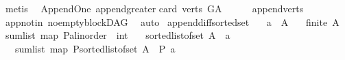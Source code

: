 \begin{isabellebody}
\ metis%
\endisatagproof
{\isafoldproof}%
%
\isadelimproof
\isanewline
%
\endisadelimproof
\isanewline
{}\isamarkupfalse%
\ {\isacharparenleft}{\kern0pt}\ Append{\isacharunderscore}{\kern0pt}One{\isacharparenright}{\kern0pt}\ append{\isacharunderscore}{\kern0pt}greater{\isacharunderscore}{\kern0pt}{}{\isacharcolon}{\kern0pt}\isanewline
{\isachardoublequoteopen}card\ {\isacharparenleft}{\kern0pt}verts\ G{\isacharunderscore}{\kern0pt}A{\isacharparenright}{\kern0pt}\ {\isachargreater}{\kern0pt}\ {}{\isachardoublequoteclose}\isanewline
%
\isadelimproof
\ \ %
\endisadelimproof
%
\isatagproof
{}\isamarkupfalse%
\ append{\isacharunderscore}{\kern0pt}verts\ \isanewline
\ \ \isamarkupfalse%
\ app{\isacharunderscore}{\kern0pt}notin\ no{\isacharunderscore}{\kern0pt}empty{\isacharunderscore}{\kern0pt}blockDAG\ \isamarkupfalse%
\ auto%
\endisatagproof
{\isafoldproof}%
%
\isadelimproof
\isanewline
%
\endisadelimproof
\isanewline
\isanewline
{}\isamarkupfalse%
\ append{\isacharunderscore}{\kern0pt}diff{\isacharunderscore}{\kern0pt}sorted{\isacharunderscore}{\kern0pt}set{\isacharcolon}{\kern0pt}\isanewline
\ \ \ {\isachardoublequoteopen}a\ {\isasymin}\ A{\isachardoublequoteclose}\isanewline
\ \ \ {\isachardoublequoteopen}finite\ A{\isachardoublequoteclose}\isanewline
{}\ {\isachardoublequoteopen}sum{\isacharunderscore}{\kern0pt}list\ {\isacharparenleft}{\kern0pt}{\isacharparenleft}{\kern0pt}map\ {\isacharparenleft}{\kern0pt}P{\isacharcolon}{\kern0pt}{\isacharcolon}{\kern0pt}{\isacharparenleft}{\kern0pt}{\isacharprime}{\kern0pt}a{\isacharcolon}{\kern0pt}{\isacharcolon}{\kern0pt}linorder\ {\isasymRightarrow}\ int{\isacharparenright}{\kern0pt}{\isacharparenright}{\kern0pt}{\isacharparenright}{\kern0pt}\isanewline
\ \ \ {\isacharparenleft}{\kern0pt}sorted{\isacharunderscore}{\kern0pt}list{\isacharunderscore}{\kern0pt}of{\isacharunderscore}{\kern0pt}set\ {\isacharparenleft}{\kern0pt}A\ {\isacharminus}{\kern0pt}\ {\isacharbraceleft}{\kern0pt}a{\isacharbraceright}{\kern0pt}{\isacharparenright}{\kern0pt}{\isacharparenright}{\kern0pt}{\isacharparenright}{\kern0pt}\ \isanewline
\ \ {\isacharequal}{\kern0pt}\ sum{\isacharunderscore}{\kern0pt}list\ {\isacharparenleft}{\kern0pt}{\isacharparenleft}{\kern0pt}map\ P{\isacharparenright}{\kern0pt}{\isacharparenleft}{\kern0pt}sorted{\isacharunderscore}{\kern0pt}list{\isacharunderscore}{\kern0pt}of{\isacharunderscore}{\kern0pt}set\ {\isacharparenleft}{\kern0pt}A{\isacharparenright}{\kern0pt}{\isacharparenright}{\kern0pt}{\isacharparenright}{\kern0pt}\ {\isacharminus}{\kern0pt}\ {\isacharparenleft}{\kern0pt}P\ a{\isacharparenright}{\kern0pt}{\isachardoublequoteclose}\isanewline

\end{isabellebody}
